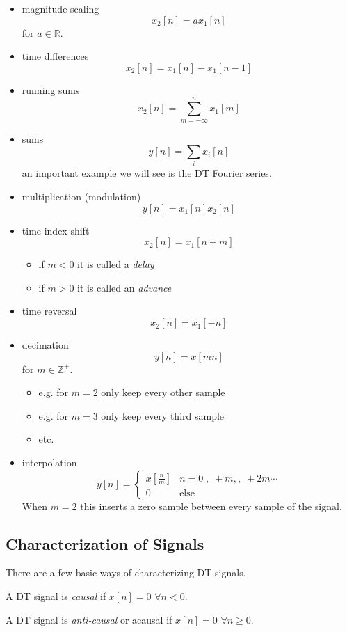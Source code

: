 \begin{itemize}
\item magnitude scaling
\[
x_2[n] = a x_1[n]
\]
for $a \in \mathbb{R}$.
\item time differences
\[
x_2[n] = x_1[n] - x_1[n-1]
\]
\item running sums
\[
x_2[n] = \sum\limits_{m = -\infty}^{n} x_1[m]
\]
\item sums
\[
y[n] = \sum\limits_{i} x_i[n]
\]
an important example we will see is the DT Fourier series.
\item multiplication (modulation)
\[
y[n] = x_1[n] x_2[n]
\]
\item time index shift
\[
x_2[n] = x_1[n+m]
\]
\begin{itemize}
\item if $m < 0$ it is called a {\it delay}
\item if $m > 0$ it is called an {\it advance}
\end{itemize}

\item time reversal
\[
x_2[n] = x_1[-n]
\]

\item decimation
\[
y[n] = x[m n]
\]
for $m \in \mathbb{Z}^+$.
\begin{itemize}
\item e.g. for $m=2$ only keep every other sample
\item e.g. for $m=3$ only keep every third sample
\item etc.
\end{itemize}

\item interpolation
\[
y[n] = \left\{  \begin{array}{cl}
x\left[ \frac{n}{m}\right] & n = 0\; , \; \pm m, , \; \pm 2m \cdots\\
0 & \mbox{else}
\end{array}\right.
\]
When $m = 2$ this inserts a zero sample between every sample of the signal.
\end{itemize}

\subsection{Characterization of Signals}

There are a few basic ways of characterizing DT signals.

\begin{definition}
A DT signal is \emph{causal} if $x[n] = 0$ $\forall n < 0$.
\end{definition}
\begin{definition}
A DT signal is \emph{anti-causal} or acausal if $x[n] = 0$ $\forall n \geq 0$.
\end{definition}

